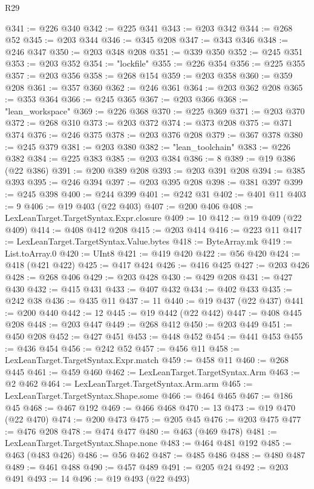 \begin{lexlean}{R29}
\begin{coremodule}
@341 := @226 @340
@342 := @225 @341
@343 := @203 @342
@344 := @268 @52
@345 := @203 @344
@346 := @345 @208
@347 := @343 @346
@348 := @246 @347
@350 := @203 @348 @208
@351 := @339 @350
@352 := @245 @351
@353 := @203 @352
@354 := "lockfile"
@355 := @226 @354
@356 := @225 @355
@357 := @203 @356
@358 := @268 @154
@359 := @203 @358
@360 := @359 @208
@361 := @357 @360
@362 := @246 @361
@364 := @203 @362 @208
@365 := @353 @364
@366 := @245 @365
@367 := @203 @366
@368 := "lean_workspace"
@369 := @226 @368
@370 := @225 @369
@371 := @203 @370
@372 := @268 @310
@373 := @203 @372
@374 := @373 @208
@375 := @371 @374
@376 := @246 @375
@378 := @203 @376 @208
@379 := @367 @378
@380 := @245 @379
@381 := @203 @380
@382 := "lean_toolchain"
@383 := @226 @382
@384 := @225 @383
@385 := @203 @384
@386 := 8
@389 := @19 @386 (@22 @386)
@391 := @200 @389 @208
@393 := @203 @391 @208
@394 := @385 @393
@395 := @246 @394
@397 := @203 @395 @208
@398 := @381 @397
@399 := @245 @398
@400 := @244 @399
@401 := @242 @31
@402 := @401 @11
@403 := 9
@406 := @19 @403 (@22 @403)
@407 := @200 @406
@408 := LexLeanTarget.TargetSyntax.Expr.closure
@409 := 10
@412 := @19 @409 (@22 @409)
@414 := @408 @412 @208
@415 := @203 @414
@416 := @223 @11
@417 := LexLeanTarget.TargetSyntax.Value.bytes
@418 := ByteArray.mk
@419 := List.toArray.{0}
@420 := UInt8
@421 := @419 @420
@422 := @56 @420
@424 := @418 (@421 @422)
@425 := @417 @424
@426 := @416 @425
@427 := @203 @426
@428 := @268 @406
@429 := @203 @428
@430 := @429 @208
@431 := @427 @430
@432 := @415 @431
@433 := @407 @432
@434 := @402 @433
@435 := @242 @38
@436 := @435 @11
@437 := 11
@440 := @19 @437 (@22 @437)
@441 := @200 @440
@442 := 12
@445 := @19 @442 (@22 @442)
@447 := @408 @445 @208
@448 := @203 @447
@449 := @268 @412
@450 := @203 @449
@451 := @450 @208
@452 := @427 @451
@453 := @448 @452
@454 := @441 @453
@455 := @436 @454
@456 := @242 @52
@457 := @456 @11
@458 := LexLeanTarget.TargetSyntax.Expr.match
@459 := @458 @11
@460 := @268 @445
@461 := @459 @460
@462 := LexLeanTarget.TargetSyntax.Arm
@463 := @2 @462
@464 := LexLeanTarget.TargetSyntax.Arm.arm
@465 := LexLeanTarget.TargetSyntax.Shape.some
@466 := @464 @465
@467 := @186 @45
@468 := @467 @192
@469 := @466 @468
@470 := 13
@473 := @19 @470 (@22 @470)
@474 := @200 @473
@475 := @205 @45
@476 := @203 @475
@477 := @476 @208
@478 := @474 @477
@480 := @463 (@469 @478)
@481 := LexLeanTarget.TargetSyntax.Shape.none
@483 := @464 @481 @192
@485 := @463 (@483 @426)
@486 := @56 @462
@487 := @485 @486
@488 := @480 @487
@489 := @461 @488
@490 := @457 @489
@491 := @205 @24
@492 := @203 @491
@493 := 14
@496 := @19 @493 (@22 @493)

\end{coremodule}
\end{lexlean}
